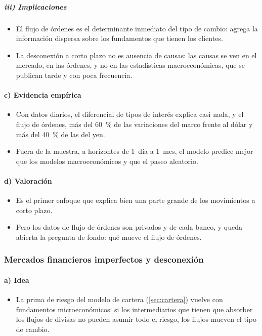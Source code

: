 \documentclass[11pt]{article}
\begin{document}
\subparagraph{iii) Implicaciones}
\begin{itemize}
\item El flujo de órdenes es el determinante inmediato del tipo de cambio: agrega la información dispersa sobre los fundamentos que tienen los clientes.
\item La desconexión a corto plazo no es ausencia de causas: las causas se ven en el mercado, en las órdenes, y no en las estadísticas macroeconómicas, que se publican tarde y con poca frecuencia.
\end{itemize}

\paragraph{c) Evidencia empírica}
\begin{itemize}
\item Con datos diarios, el diferencial de tipos de interés explica casi nada, y el flujo de órdenes, más del 60~\% de las variaciones del marco frente al dólar y más del 40~\% de las del yen\nocite{EvansLyons2002}.
\item Fuera de la muestra, a horizontes de 1~día a 1~mes, el modelo predice mejor que los modelos macroeconómicos y que el paseo aleatorio\nocite{EvansLyons2005}.
\end{itemize}

\paragraph{d) Valoración}
\begin{itemize}
\item Es el primer enfoque que explica bien una parte grande de los movimientos a corto plazo.
\item Pero los datos de flujo de órdenes son privados y de cada banco, y queda abierta la pregunta de fondo: qué mueve el flujo de órdenes.
\end{itemize}

\subsubsection{Mercados financieros imperfectos y desconexión}\label{sec:gabaix-maggiori}

\paragraph{a) Idea}
\begin{itemize}
\item La prima de riesgo del modelo de cartera (\ref{sec:cartera}) vuelve con fundamentos microeconómicos: si los intermediarios que tienen que absorber los flujos de divisas no pueden asumir todo el riesgo, los flujos mueven el tipo de cambio.
\end{itemize}
\end{document}
